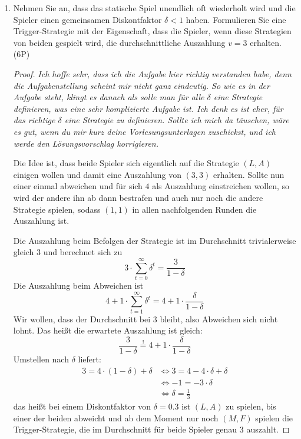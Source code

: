 \documentclass[12pt]{article}
\begin{document}
\begin{enumerate}[label=\alph*\upshape)]
\begin{proof}
			\textit{Bemerkung: Hier könntest du dir mal überlegen, wie viel Teilspiele ein dynamisches Spiel hätte. Solltest du Probleme haben, zeichne dir einen Spielbaum ein, aber vergiss die Informationsbezirke nicht}
		\end{proof}
	\item Nehmen Sie an, dass das statische Spiel unendlich oft wiederholt wird und die Spieler einen gemeinsamen Diskontfaktor $\delta < 1$ haben. Formulieren Sie eine Trigger-Strategie mit der Eigenschaft, dass die Spieler, wenn diese Strategien von beiden gespielt wird, die durchschnittliche Auszahlung $v = 3$ erhalten. (6P) 
		\begin{proof}
			\textit{Ich hoffe sehr, dass ich die Aufgabe hier richtig verstanden habe, denn die Aufgabenstellung scheint mir nicht ganz eindeutig. So wie es in der Aufgabe steht, klingt es danach als solle man für alle $\delta$ eine Strategie definieren, was eine sehr komplizierte Aufgabe ist. Ich denk es ist eher, für das richtige $\delta$ eine Strategie zu definieren. Sollte ich mich da täuschen, wäre es gut, wenn du mir kurz deine Vorlesungsunterlagen zuschickst, und ich werde den Lösungsvorschlag korrigieren.} ~\smallskip
			
			 Die Idee ist, dass beide Spieler sich eigentlich auf die Strategie $(L, A)$ einigen wollen und damit eine Auszahlung von $(3, 3)$ erhalten. Sollte nun einer einmal abweichen und für sich $4$ als Auszahlung einstreichen wollen, so wird der andere ihn ab dann bestrafen und auch nur noch die andere Strategie spielen, sodass $(1, 1)$ in allen nachfolgenden Runden die Auszahlung ist. ~\smallskip
			
			Die Auszahlung beim Befolgen der Strategie ist im Durchschnitt trivialerweise gleich 3 und berechnet sich zu
			$$ 3 \cdot \sum_{t = 0}^\infty \delta^t = \frac{3}{1 - \delta} $$
			Die Auszahlung beim Abweichen ist
			$$ 4 + 1 \cdot \sum_{t = 1}^\infty \delta^t = 4 + 1 \cdot \frac{\delta}{1 - \delta} $$
			Wir wollen, dass der Durchschnitt bei 3 bleibt, also Abweichen sich nicht lohnt. Das heißt die erwartete Auszahlung ist gleich:
			$$ \frac{3}{1 - \delta} \overset{!}{=} 4 + 1 \cdot \frac{\delta}{1 - \delta} $$
			Umstellen nach $\delta$ liefert:
			\begin{align*}
				3 = 4 \cdot (1 - \delta) + \delta & \iff 3 = 4 - 4 \cdot \delta + \delta \\
				& \iff -1 = -3 \cdot \delta \\
				& \iff \delta = \frac{1}{3}
			\end{align*}
			das heißt bei einem Diskontfaktor von $\delta = 0.3$ ist $(L, A)$ zu spielen, bis einer der beiden abweicht und ab dem Moment nur noch $(M, F)$ spielen die Trigger-Strategie, die im Durchschnitt für beide Spieler genau 3 auszahlt.
		\end{proof}
\end{enumerate}
\end{document}
